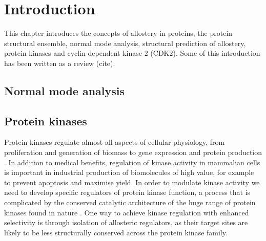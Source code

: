 \chapter{Introduction}
\label{cha:introduction}

This chapter introduces the concepts of allostery in proteins, the protein structural ensemble, normal mode analysis, structural prediction of allostery, protein kinases and cyclin-dependent kinase 2 (CDK2).
Some of this introduction has been written as a review (cite).


\section{Normal mode analysis}




\section{Protein kinases}

Protein kinases regulate almost all aspects of cellular physiology, from proliferation and generation of biomass to gene expression and protein production \cite{Manning2002}.
In addition to medical benefits, regulation of kinase activity in mammalian cells is important in industrial production of biomolecules of high value, for example to prevent apoptosis and maximise yield.
In order to modulate kinase activity we need to develop specific regulators of protein kinase function, a process that is complicated by the conserved catalytic architecture of the huge range of protein kinases found in nature \cite{Muller2015}.
One way to achieve kinase regulation with enhanced selectivity is through isolation of allosteric regulators, as their target sites are likely to be less structurally conserved across the protein kinase family.

